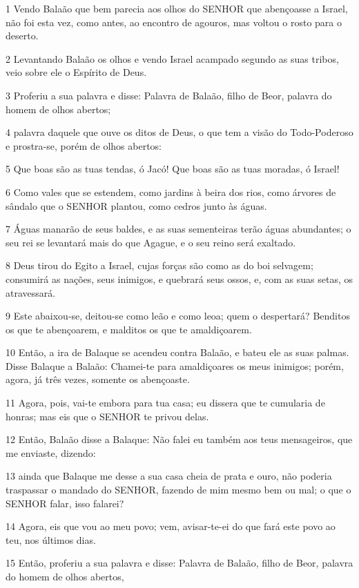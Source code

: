 \par 1 Vendo Balaão que bem parecia aos olhos do SENHOR que abençoasse a Israel, não foi esta vez, como antes, ao encontro de agouros, mas voltou o rosto para o deserto.
\par 2 Levantando Balaão os olhos e vendo Israel acampado segundo as suas tribos, veio sobre ele o Espírito de Deus.
\par 3 Proferiu a sua palavra e disse: Palavra de Balaão, filho de Beor, palavra do homem de olhos abertos;
\par 4 palavra daquele que ouve os ditos de Deus, o que tem a visão do Todo-Poderoso e prostra-se, porém de olhos abertos:
\par 5 Que boas são as tuas tendas, ó Jacó! Que boas são as tuas moradas, ó Israel!
\par 6 Como vales que se estendem, como jardins à beira dos rios, como árvores de sândalo que o SENHOR plantou, como cedros junto às águas.
\par 7 Águas manarão de seus baldes, e as suas sementeiras terão águas abundantes; o seu rei se levantará mais do que Agague, e o seu reino será exaltado.
\par 8 Deus tirou do Egito a Israel, cujas forças são como as do boi selvagem; consumirá as nações, seus inimigos, e quebrará seus ossos, e, com as suas setas, os atravessará.
\par 9 Este abaixou-se, deitou-se como leão e como leoa; quem o despertará? Benditos os que te abençoarem, e malditos os que te amaldiçoarem.
\par 10 Então, a ira de Balaque se acendeu contra Balaão, e bateu ele as suas palmas. Disse Balaque a Balaão: Chamei-te para amaldiçoares os meus inimigos; porém, agora, já três vezes, somente os abençoaste.
\par 11 Agora, pois, vai-te embora para tua casa; eu dissera que te cumularia de honras; mas eis que o SENHOR te privou delas.
\par 12 Então, Balaão disse a Balaque: Não falei eu também aos teus mensageiros, que me enviaste, dizendo:
\par 13 ainda que Balaque me desse a sua casa cheia de prata e ouro, não poderia traspassar o mandado do SENHOR, fazendo de mim mesmo bem ou mal; o que o SENHOR falar, isso falarei?
\par 14 Agora, eis que vou ao meu povo; vem, avisar-te-ei do que fará este povo ao teu, nos últimos dias.
\par 15 Então, proferiu a sua palavra e disse: Palavra de Balaão, filho de Beor, palavra do homem de olhos abertos,
